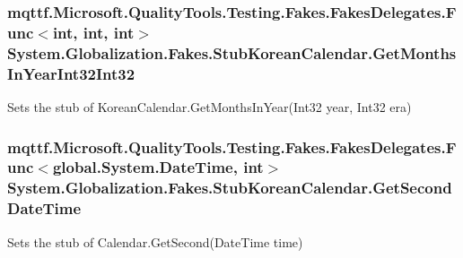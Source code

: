 \hypertarget{class_system_1_1_globalization_1_1_fakes_1_1_stub_korean_calendar_ab2bd8029ee2a15300b1df1c4260d546f}{
\subsubsection[{Get\-Months\-In\-Year\-Int32\-Int32}]{\setlength{\rightskip}{0pt plus 5cm}mqttf.\-Microsoft.\-Quality\-Tools.\-Testing.\-Fakes.\-Fakes\-Delegates.\-Func$<$int, int, int$>$ System.\-Globalization.\-Fakes.\-Stub\-Korean\-Calendar.\-Get\-Months\-In\-Year\-Int32\-Int32}}\label{class_system_1_1_globalization_1_1_fakes_1_1_stub_korean_calendar_ab2bd8029ee2a15300b1df1c4260d546f}


Sets the stub of Korean\-Calendar.\-Get\-Months\-In\-Year(\-Int32 year, Int32 era)

\hypertarget{class_system_1_1_globalization_1_1_fakes_1_1_stub_korean_calendar_af7d4e0fbd8533a487a3ba0f8d89912f2}{
\subsubsection[{Get\-Second\-Date\-Time}]{\setlength{\rightskip}{0pt plus 5cm}mqttf.\-Microsoft.\-Quality\-Tools.\-Testing.\-Fakes.\-Fakes\-Delegates.\-Func$<$global.\-System.\-Date\-Time, int$>$ System.\-Globalization.\-Fakes.\-Stub\-Korean\-Calendar.\-Get\-Second\-Date\-Time}}\label{class_system_1_1_globalization_1_1_fakes_1_1_stub_korean_calendar_af7d4e0fbd8533a487a3ba0f8d89912f2}


Sets the stub of Calendar.\-Get\-Second(\-Date\-Time time)

